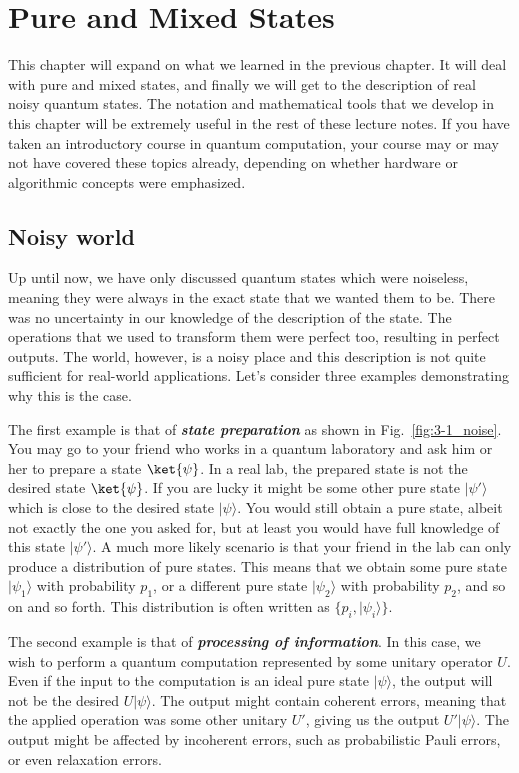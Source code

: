 \chapter[Pure and Mixed States]{Pure and Mixed States}
\label{sec:3_pure_mixed}

This chapter will expand on what we learned in the previous chapter.
It will deal with pure and mixed states, and finally we will get to the description of real noisy quantum states.
The notation and mathematical tools that we develop in this chapter will be extremely useful in the rest of these lecture notes. If you have taken an introductory course in quantum computation, your course may or may not have covered these topics already, depending on whether hardware or algorithmic concepts were emphasized.

\section{Noisy world}
\label{sec:3-1_noisy_world}

Up until now, we have only discussed quantum states which were noiseless, meaning they
were always in the exact state that we wanted them to be.
There was no uncertainty in our knowledge of the description of the state.
The operations that we used to transform them were perfect too, resulting in perfect outputs.
The world, however, is a noisy place and this description is not quite sufficient for real-world applications.
Let's consider three examples demonstrating why this is the case.

The first example is that of \textbf{\emph{state preparation}} as shown in Fig.~\ref{fig:3-1_noise}.
You may go to your friend who works in a quantum laboratory and ask him or her to prepare
a state $\ket{\psi}$.
In a real lab, the prepared state is not the desired state $\ket{\psi}$.
If you are lucky it might be some other pure state $|\psi'\rangle$ which is close to the desired state $|\psi\rangle$.
You would still obtain a pure state, albeit not exactly the one you asked for, but at least you would have full knowledge of this state $|\psi'\rangle$.
A much more likely scenario is that your friend in the lab can only produce a distribution of pure states.
This means that we obtain some pure state $|\psi_1\rangle$ with probability $p_1$, or a different pure state $|\psi_2\rangle$ with probability $p_2$, and so on and so forth.
This distribution is often written as $\{p_i,|\psi_i\rangle\}$.

The second example is that of \textbf{\emph{processing of information}}.
In this case, we wish to perform a quantum computation represented by some unitary operator $U$.
Even if the input to the computation is an ideal pure state $|\psi\rangle$, the output will not be the desired $U|\psi\rangle$.
The output might contain coherent errors, meaning that the applied operation was some other unitary $U'$, giving us the output $U'|\psi\rangle$.
The output might be affected by incoherent errors, such as probabilistic Pauli errors, or even relaxation errors.


